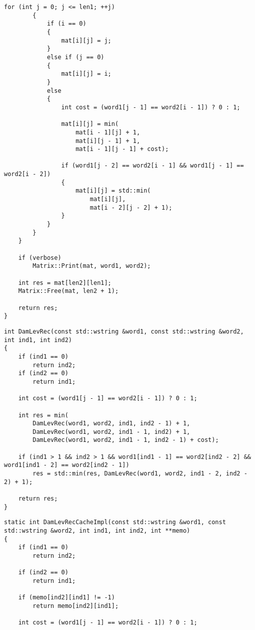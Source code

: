 \clearpage
\begin{lstlisting}[caption=Матричный алгоритм поиска расстояния Дамерау~---~Левенштейна (часть 2)]
        for (int j = 0; j <= len1; ++j)
        {
            if (i == 0)
            {
                mat[i][j] = j;
            }
            else if (j == 0)
            {
                mat[i][j] = i;
            }
            else
            {
                int cost = (word1[j - 1] == word2[i - 1]) ? 0 : 1;

                mat[i][j] = min(
                    mat[i - 1][j] + 1,
                    mat[i][j - 1] + 1,
                    mat[i - 1][j - 1] + cost);

                if (word1[j - 2] == word2[i - 1] && word1[j - 1] == word2[i - 2])
                {
                    mat[i][j] = std::min(
                        mat[i][j],
                        mat[i - 2][j - 2] + 1);
                }
            }
        }
    }

    if (verbose)
        Matrix::Print(mat, word1, word2);

    int res = mat[len2][len1];
    Matrix::Free(mat, len2 + 1);

    return res;
}
\end{lstlisting}

\begin{lstlisting}[caption=Рекурсивный алгоритм поиска расстояния Дамерау~---~Левенштейна]
int DamLevRec(const std::wstring &word1, const std::wstring &word2, int ind1, int ind2)
{
    if (ind1 == 0)
        return ind2;
    if (ind2 == 0)
        return ind1;

    int cost = (word1[j - 1] == word2[i - 1]) ? 0 : 1;

    int res = min(
        DamLevRec(word1, word2, ind1, ind2 - 1) + 1,
        DamLevRec(word1, word2, ind1 - 1, ind2) + 1,
        DamLevRec(word1, word2, ind1 - 1, ind2 - 1) + cost);

    if (ind1 > 1 && ind2 > 1 && word1[ind1 - 1] == word2[ind2 - 2] && word1[ind1 - 2] == word2[ind2 - 1])
        res = std::min(res, DamLevRec(word1, word2, ind1 - 2, ind2 - 2) + 1);

    return res;
}
\end{lstlisting}

\begin{lstlisting}[caption=Рекурсивный алгоритм поиска расстояния Дамерау~---~Левенштейна с кэшированием (реализация) (часть 1)]
static int DamLevRecCacheImpl(const std::wstring &word1, const std::wstring &word2, int ind1, int ind2, int **memo)
{
    if (ind1 == 0)
        return ind2;

    if (ind2 == 0)
        return ind1;

    if (memo[ind2][ind1] != -1)
        return memo[ind2][ind1];
    
    int cost = (word1[j - 1] == word2[i - 1]) ? 0 : 1;
\end{lstlisting}

